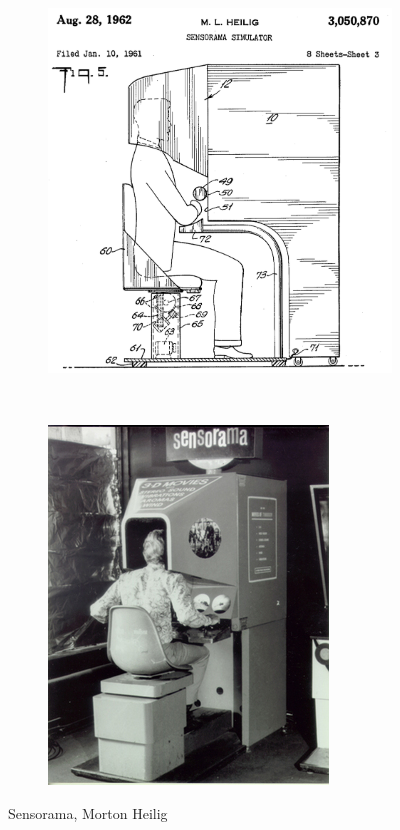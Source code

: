\documentclass[a4]{scrartcl}
\begin{document}
\begin{figure}[!h]
	\centering
	\begin{subfigure}{.4\textwidth}
	  \centering
	  \includegraphics[width=\linewidth]{sensorama-patent}
	\end{subfigure}
	~
	\begin{subfigure}{.4\textwidth}
	  \centering
	  \includegraphics[width=0.8\linewidth]{sensorama}
	\end{subfigure}

 	\caption{Sensorama, Morton Heilig}
\end{figure}
\end{document}
